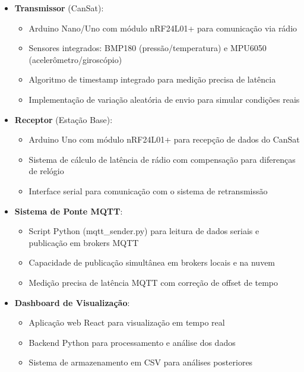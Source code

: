 \documentclass[hidelinks]{sbrt}
\begin{document}
\begin{itemize}
    \item \textbf{Transmissor} (CanSat):
    \begin{itemize}
        \item Arduino Nano/Uno com módulo nRF24L01+ para comunicação via rádio
        \item Sensores integrados: BMP180 (pressão/temperatura) e MPU6050 (acelerômetro/giroscópio)
        \item Algoritmo de timestamp integrado para medição precisa de latência
        \item Implementação de variação aleatória de envio para simular condições reais
    \end{itemize}
    
    \item \textbf{Receptor} (Estação Base):
    \begin{itemize}
        \item Arduino Uno com módulo nRF24L01+ para recepção de dados do CanSat
        \item Sistema de cálculo de latência de rádio com compensação para diferenças de relógio
        \item Interface serial para comunicação com o sistema de retransmissão
    \end{itemize}
    
    \item \textbf{Sistema de Ponte MQTT}:
    \begin{itemize}
        \item Script Python (mqtt\_sender.py) para leitura de dados seriais e publicação em brokers MQTT
        \item Capacidade de publicação simultânea em brokers locais e na nuvem
        \item Medição precisa de latência MQTT com correção de offset de tempo
    \end{itemize}
    
    \item \textbf{Dashboard de Visualização}:
    \begin{itemize}
        \item Aplicação web React para visualização em tempo real
        \item Backend Python para processamento e análise dos dados
        \item Sistema de armazenamento em CSV para análises posteriores
    \end{itemize}
\end{itemize}
\end{document}
